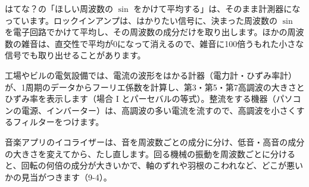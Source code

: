 \begin{butsuri}
\noindent\begin{minipage}[c]{0.64\linewidth}
\raggedright
はてな？の「ほしい周波数の $\sin$ をかけて平均する」は、そのまま計測器になっています。ロックインアンプは、はかりたい信号に、決まった周波数の $\sin$ を電子回路でかけて平均し、その周波数の成分だけを取り出します。ほかの周波数の雑音は、直交性で平均が0になって消えるので、雑音に100倍うもれた小さな信号でも取り出せることがあります。
\end{minipage}\hfill
\begin{minipage}[c]{0.32\linewidth}
\centering
{}
\end{minipage}
\par\vspace{6pt}
工場やビルの電気設備では、電流の波形をはかる計器（電力計・ひずみ率計）が、1周期のデータからフーリエ係数を計算し、第3・第5・第7高調波の大きさとひずみ率を表示します（場合 I とパーセバルの等式）。整流をする機器（パソコンの電源、インバーター）は、高調波の多い電流を流すので、高調波を小さくするフィルターをつけます。
\par\vspace{6pt}
音楽アプリのイコライザーは、音を周波数ごとの成分に分け、低音・高音の成分の大きさを変えてから、たし直します。回る機械の振動を周波数ごとに分けると、回転の何倍の成分が大きいかで、軸のずれや羽根のこわれなど、どこが悪いかの見当がつきます（9-4）。
\end{butsuri}

